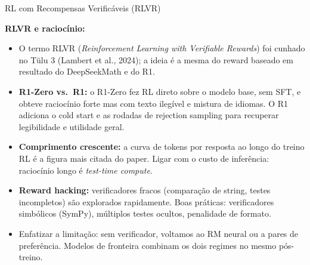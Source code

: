 \documentclass[aspectratio=169, xcolor=dvipsnames]{beamer}
\begin{document}
\begin{frame}{RL com Recompensas Verificáveis (RLVR) \cite{deepseekr1,lambert2024tulu3}}
{    \textbf{RLVR e raciocínio:}
    \begin{itemize}
      \item O termo RLVR (\textit{Reinforcement Learning with Verifiable Rewards}) foi cunhado no Tülu 3 (Lambert et al., 2024); a ideia é a mesma do reward baseado em resultado do DeepSeekMath e do R1.
      \item \textbf{R1-Zero vs.\ R1:} o R1-Zero fez RL direto sobre o modelo base, sem SFT, e obteve raciocínio forte mas com texto ilegível e mistura de idiomas. O R1 adiciona o cold start e as rodadas de rejection sampling para recuperar legibilidade e utilidade geral.
      \item \textbf{Comprimento crescente:} a curva de tokens por resposta ao longo do treino RL é a figura mais citada do paper. Ligar com o custo de inferência: raciocínio longo é \textit{test-time compute}.
      \item \textbf{Reward hacking:} verificadores fracos (comparação de string, testes incompletos) são explorados rapidamente. Boas práticas: verificadores simbólicos (SymPy), múltiplos testes ocultos, penalidade de formato.
      \item Enfatizar a limitação: sem verificador, voltamos ao RM neural ou a pares de preferência. Modelos de fronteira combinam os dois regimes no mesmo pós-treino.
    \end{itemize}
  }
  \end{frame}
\end{document}
